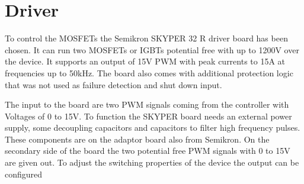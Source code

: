 \section{Driver}\label{sec:driver}

To control the MOSFETs the Semikron SKYPER 32 R driver board has been chosen. It can run two MOSFETs or IGBTs potential free with up to 1200V over the device. It supports an output of 15V PWM with peak currents to 15A at frequencies up to 50kHz.
The board also comes with additional protection logic that was not used as failure detection and shut down input.

The input to the board are two PWM signals coming from the controller with Voltages of 0 to 15V. To function the SKYPER board needs an external power supply, some decoupling capacitors and capacitors to filter high frequency pulses. These components are on the adaptor board also from Semikron. 
On the secondary side of the board the two potential free PWM signals with 0 to 15V are given out. To adjust the switching properties of the device the output can be configured 
